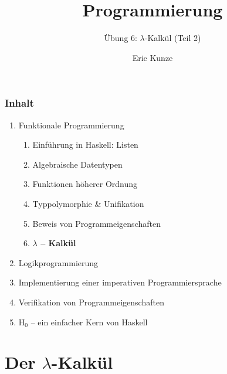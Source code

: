 \documentclass{beamer}
\begin{document}
	
	\title{Programmierung}
	\subtitle{Übung 6: $\lambda$-Kalkül (Teil 2)}
	\author{Eric Kunze}
	\date{}
	
	\maketitle
	


\begin{frame}[fragile] \frametitle{Inhalt}
	\begin{enumerate}
		\item Funktionale Programmierung
		\begin{enumerate}
			\item Einführung in Haskell: Listen
			\item Algebraische Datentypen
			\item Funktionen höherer Ordnung
			\item Typpolymorphie \& Unifikation
			\item Beweis von Programmeigenschaften
			\item \textbf{$\lambda$ -- Kalkül}
		\end{enumerate}
		\item Logikprogrammierung
		\item Implementierung einer imperativen Programmiersprache
		\item Verifikation von Programmeigenschaften
		\item H${}_\text{0}$ -- ein einfacher Kern von Haskell
	\end{enumerate}
\end{frame}


\section{Der $\lambda$-Kalkül}
\end{document}
